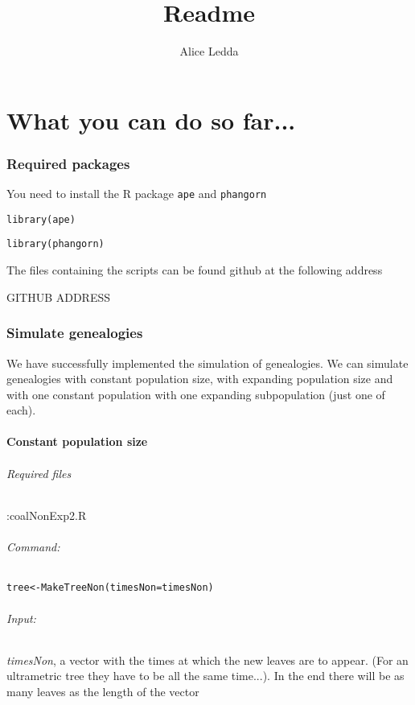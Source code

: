 \documentclass[12pt,a4paper]{article}
\author{Alice Ledda}
\title{Readme}
\begin{document}
\maketitle

\part*{What you can do so far...}
\section{Required packages}
You need to install the R package \verb!ape! and \verb!phangorn!

\verb!library(ape)!

\verb!library(phangorn)!

The files containing the scripts can be found github at the following address

GITHUB ADDRESS



\section{Simulate genealogies}
We have successfully implemented the simulation of genealogies.
We can simulate genealogies with constant population size, with expanding population size and with one constant population with one expanding subpopulation (just one of each).


\subsection{Constant population size}
\paragraph{Required files}:coalNonExp2.R
\paragraph{Command:}
\verb!tree<-MakeTreeNon(timesNon=timesNon)!

\paragraph{Input:}
 \textit{timesNon}, a vector with the times at which the new leaves are to appear. (For an ultrametric tree they have to be all the same time...). In the end there will be as many leaves as the length of the vector 
\end{document}
